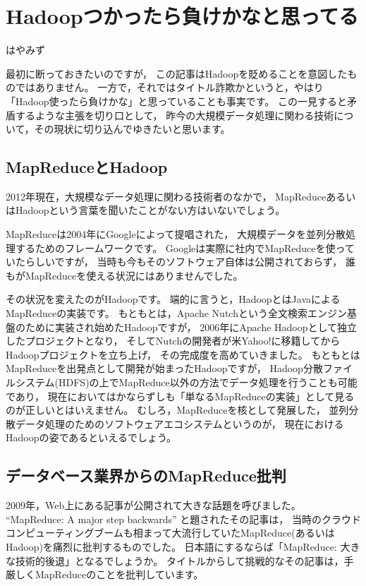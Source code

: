 
\chapter{Hadoopつかったら負けかなと思ってる}

\begin{flushright}
はやみず
\end{flushright}

最初に断っておきたいのですが，
この記事はHadoopを貶めることを意図したものではありません。
一方で，それではタイトル詐欺かというと，やはり「Hadoop使ったら負けかな」と思っていることも事実です。
この一見すると矛盾するような主張を切り口として，
昨今の大規模データ処理に関わる技術について，その現状に切り込んでゆきたいと思います。

\section{MapReduceとHadoop}

2012年現在，大規模なデータ処理に関わる技術者のなかで，
MapReduceあるいはHadoopという言葉を聞いたことがない方はいないでしょう。

MapReduceは2004年にGoogleによって提唱された，
大規模データを並列分散処理するためのフレームワークです。
Googleは実際に社内でMapReduceを使っていたらしいですが，
当時も今もそのソフトウェア自体は公開されておらず，
誰もがMapReduceを使える状況にはありませんでした。

その状況を変えたのがHadoopです。
端的に言うと，HadoopとはJavaによるMapReduceの実装です。
もともとは，Apache Nutchという全文検索エンジン基盤のために実装され始めたHadoopですが，
2006年にApache Hadoopとして独立したプロジェクトとなり，
そしてNutchの開発者が米Yahoo!に移籍してからHadoopプロジェクトを立ち上げ，
その完成度を高めていきました。
もともとはMapReduceを出発点として開発が始まったHadoopですが，
Hadoop分散ファイルシステム(HDFS)の上でMapReduce以外の方法でデータ処理を行うことも可能であり，
現在においてはかならずしも「単なるMapReduceの実装」として見るのが正しいとはいえません。
むしろ，MapReduceを核として発展した，
並列分散データ処理のためのソフトウェアエコシステムというのが，
現在におけるHadoopの姿であるといえるでしょう。

\section{データベース業界からのMapReduce批判}

2009年，Web上にある記事が公開されて大きな話題を呼びました。
``MapReduce: A major step backwards'' と題されたその記事は，
当時のクラウドコンピューティングブームも相まって大流行していたMapReduce(あるいはHadoop)を痛烈に批判するものでした。
日本語にするならば「MapReduce: 大きな技術的後退」となるでしょうか。
タイトルからして挑戦的なその記事は，手厳しくMapReduceのことを批判しています。

